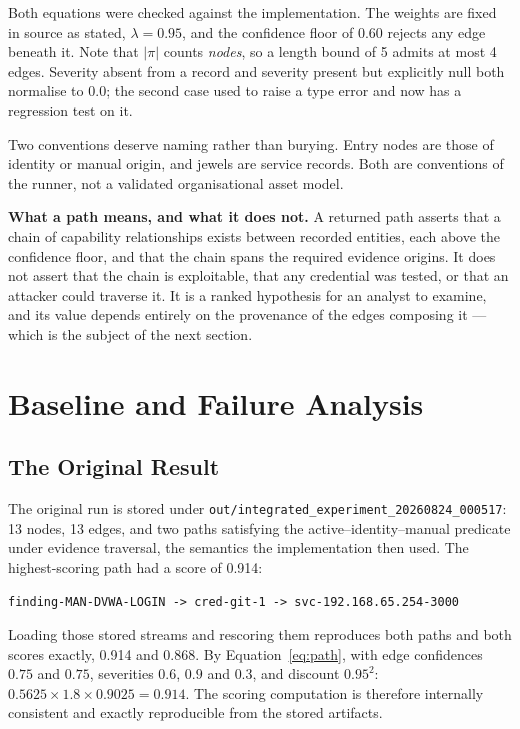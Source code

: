 \documentclass[11pt,a4paper]{article}
\newcommand{\bs}{\discretionary{}{}{}}
\begin{document}
Both equations were checked against the implementation. The weights are fixed in source as stated, $\lambda=0.95$, and the confidence floor of $0.60$ rejects any edge beneath it. Note that $|\pi|$ counts \emph{nodes}, so a length bound of 5 admits at most 4 edges. Severity absent from a record and severity present but explicitly null both normalise to $0.0$; the second case used to raise a type error and now has a regression test on it.

Two conventions deserve naming rather than burying. Entry nodes are those of identity or manual origin, and jewels are service records. Both are conventions of the runner, not a validated organisational asset model.

\textbf{What a path means, and what it does not.} A returned path asserts that a chain of capability relationships exists between recorded entities, each above the confidence floor, and that the chain spans the required evidence origins. It does not assert that the chain is exploitable, that any credential was tested, or that an attacker could traverse it. It is a ranked hypothesis for an analyst to examine, and its value depends entirely on the provenance of the edges composing it --- which is the subject of the next section.

\section{Baseline and Failure Analysis}\label{sec:baseline}
\subsection{The Original Result}
The original run is stored under \texttt{out/\bs integrated\bs \_experiment\bs \_20260824\bs \_000517}: 13 nodes, 13 edges, and two paths satisfying the active--identity--manual predicate under evidence traversal, the semantics the implementation then used. The highest-scoring path had a score of 0.914:
\begin{verbatim}
finding-MAN-DVWA-LOGIN -> cred-git-1 -> svc-192.168.65.254-3000
\end{verbatim}
Loading those stored streams and rescoring them reproduces both paths and both scores exactly, 0.914 and 0.868. By Equation~\eqref{eq:path}, with edge confidences $0.75$ and $0.75$, severities $0.6$, $0.9$ and $0.3$, and discount $0.95^{2}$: $0.5625\times1.8\times0.9025=0.914$. The scoring computation is therefore internally consistent and exactly reproducible from the stored artifacts.
\end{document}
